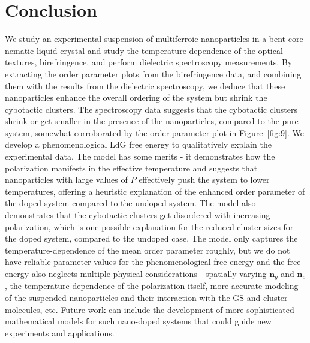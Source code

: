 \documentclass[reprint,amsfonts,amsmath,amssymb,aps,pre,floatfix,10pt]{revtex4-1}
\newcommand\n{\mathbf{n}}
\begin{document}
\section{Conclusion}
We study an experimental suspension of multiferroic nanoparticles in a bent-core nematic liquid crystal and study the temperature dependence of the optical textures, birefringence, and perform dielectric spectroscopy measurements. By extracting the order parameter plots from the birefringence data, and combining them with the results from the dielectric spectroscopy, we deduce that these nanoparticles enhance the overall ordering of the system but shrink the cybotactic clusters. The spectroscopy data suggests that the cybotactic clusters shrink or get smaller in the presence of the nanoparticles, compared to the pure system, somewhat corroborated by the order parameter plot in Figure~\ref{fig:9}. We develop a phenomenological LdG free energy to qualitatively explain the experimental data. The model has some merits -  it demonstrates how the polarization manifests in the effective temperature and suggests that nanoparticles with large values of $P$ effectively push the system to lower temperatures, offering a heuristic explanation of the enhanced order parameter of the doped system compared to the undoped system. The model also demonstrates that the cybotactic clusters get disordered with increasing polarization,  which is one possible explanation for the reduced cluster sizes for the doped system, compared to the undoped case. The model only captures the temperature-dependence of the mean order parameter roughly, but we do not have reliable parameter values for the phenomenological free energy and the free energy also neglects multiple physical considerations - spatially varying $\n_g$ and $\n_c$, the temperature-dependence of the polarization itself, more accurate modeling of the suspended nanoparticles and their interaction with the GS and cluster molecules, etc. Future work can include the development of more sophisticated mathematical models for such nano-doped systems that could guide new experiments and applications.
\end{document}
